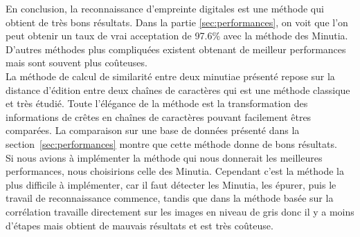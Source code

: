 En conclusion, la reconnaissance d'empreinte digitales est une méthode
qui obtient de très bons résultats. Dans la partie
\ref{sec:performances}, on voit que l'on peut obtenir un taux de vrai
acceptation de 97.6\% avec la méthode des Minutia. D'autres méthodes
plus compliquées existent obtenant de meilleur performances mais sont
souvent plus coûteuses.\\

La méthode de calcul de similarité entre deux minutiae présenté repose
sur la distance d'édition entre deux chaînes de caractères qui est une
méthode classique et très étudié. Toute l'élégance de la méthode est
la transformation des informations de crêtes en chaînes de caractères
pouvant facilement êtres comparées. La comparaison sur une base de
données présenté dans la section~\ref{sec:performances} montre que
cette méthode donne de bons résultats.\\

Si nous avions à implémenter la méthode qui nous donnerait les
meilleures performances, nous choisirions celle des Minutia. Cependant
c'est la méthode la plus difficile à implémenter, car il faut détecter
les Minutia, les épurer, puis le travail de reconnaissance commence,
tandis que dans la méthode basée sur la corrélation travaille directement sur les images en niveau de gris donc il y a moins d'étapes mais obtient de mauvais résultats et est très coûteuse.


